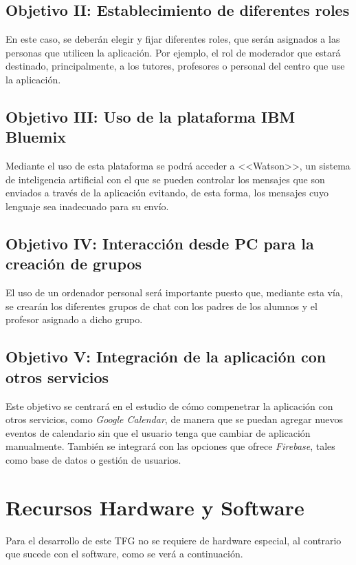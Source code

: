 \newpage

\subsection{Objetivo II: Establecimiento de diferentes roles}
En este caso, se deberán elegir y fijar diferentes roles, que serán asignados a las personas que utilicen la aplicación. Por ejemplo, el rol de moderador que estará destinado, principalmente, a los tutores, profesores o personal del centro que use la aplicación.

\subsection{Objetivo III: Uso de la plataforma IBM Bluemix}
Mediante el uso de esta plataforma se podrá acceder a <<Watson>>, un sistema de inteligencia artificial con el que se pueden controlar los mensajes que son enviados a través de la aplicación evitando, de esta forma, los mensajes cuyo lenguaje sea inadecuado para su envío.

\subsection{Objetivo IV: Interacción desde PC para la creación de grupos}
El uso de un ordenador personal será importante puesto que, mediante esta vía, se crearán los diferentes grupos de chat con los padres de los alumnos y el profesor asignado a dicho grupo.

\subsection{Objetivo V: Integración de la aplicación con otros servicios}
Este objetivo se centrará en el estudio de cómo compenetrar la aplicación con otros servicios, como \textit{Google Calendar}, de manera que se puedan agregar nuevos eventos de calendario sin que el usuario tenga que cambiar de aplicación manualmente. También se integrará con las opciones que ofrece \textit{Firebase}, tales como base de datos o gestión de usuarios.

\section{Recursos Hardware y Software}
Para el desarrollo de este TFG no se requiere de hardware especial, al contrario que sucede con el software, como se verá a continuación.

